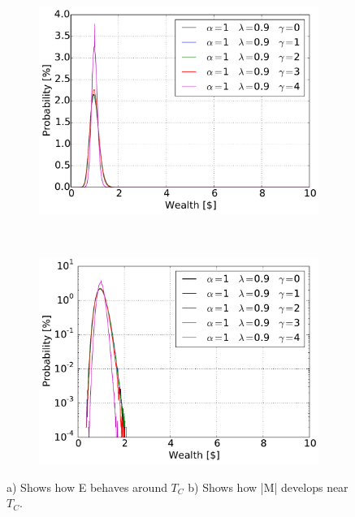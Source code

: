 \begin{figure}[H]
    \centering
    \begin{subfigure}{0.5\textwidth}
        \centering
        \includegraphics[width=\linewidth]{result/bilder/5e-1-90}
        \caption{}
    \end{subfigure}%
    ~ 
    \begin{subfigure}{0.5\textwidth}
        \centering
        \includegraphics[width=\linewidth]{result/bilder/5e-1-90-log}
        \caption{}
    \end{subfigure}
    \caption{a) Shows how E behaves around $T_C$ b) Shows how |M| develops near $T_C$.}
    \label{fig:5e-1-90}
\end{figure}



